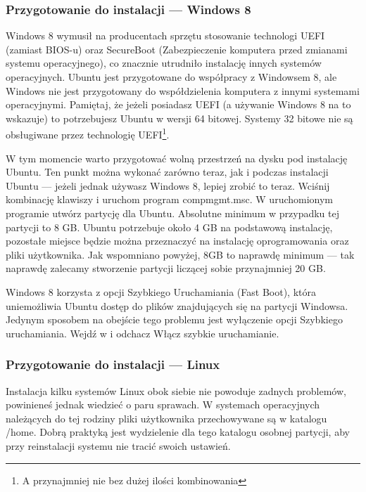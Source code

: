 \subsubsection{Przygotowanie do instalacji --- Windows 8}
\label{sec:przygotowanie_windows8}
Windows 8 wymusił na producentach sprzętu stosowanie technologi UEFI (zamiast BIOS-u) oraz SecureBoot (Zabezpieczenie komputera przed zmianami systemu operacyjnego), co znacznie utrudniło instalację innych systemów operacyjnych. Ubuntu jest przygotowane do współpracy z Windowsem 8, ale Windows nie jest przygotowany do współdzielenia komputera z innymi systemami operacyjnymi. Pamiętaj, że jeżeli posiadasz UEFI (a używanie Windows 8 na to wskazuje) to potrzebujesz Ubuntu w wersji 64 bitowej. Systemy 32 bitowe nie są obsługiwane przez technologię UEFI\footnote{A przynajmniej nie bez dużej ilości kombinowania}.

W tym momencie warto przygotować wolną przestrzeń na dysku pod instalację Ubuntu. Ten punkt można wykonać zarówno teraz, jak i podczas instalacji Ubuntu --- jeżeli jednak używasz Windows 8, lepiej zrobić to teraz. Wciśnij kombinację klawiszy  i uruchom program \textcolor{ubuntu_orange}{compmgmt.msc}. W uruchomionym programie utwórz partycję dla Ubuntu. Absolutne minimum w przypadku tej partycji to 8 GB. Ubuntu potrzebuje około 4 GB na podstawową instalację, pozostałe miejsce będzie można przeznaczyć na instalację oprogramowania oraz pliki użytkownika. Jak wspomniano powyżej, 8GB to naprawdę minimum --- tak naprawdę zalecamy stworzenie partycji liczącej sobie przynajmniej 20 GB.

Windows 8 korzysta z opcji Szybkiego Uruchamiania (Fast Boot), która uniemożliwia Ubuntu dostęp do plików znajdujących się na partycji Windowsa. Jedynym sposobem na obejście tego problemu jest wyłączenie opcji Szybkiego uruchamiania. Wejdź w  i odchacz \textcolor{ubuntu_orange}{Włącz szybkie uruchamianie}.
\subsubsection{Przygotowanie do instalacji --- Linux}
\label{sec:przygotowanie_linux}
Instalacja kilku systemów Linux obok siebie nie powoduje zadnych problemów, powinieneś jednak wiedzieć o paru sprawach. W systemach operacyjnych należących do tej rodziny pliki użytkownika przechowywane są w katalogu /home. Dobrą praktyką jest wydzielenie dla tego katalogu osobnej partycji, aby przy reinstalacji systemu nie tracić swoich ustawień.

